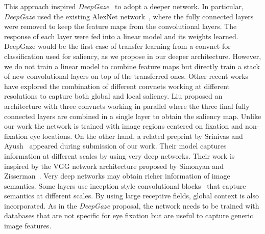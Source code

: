 \documentclass[10pt,twocolumn,letterpaper]{article}
\begin{document}
This approach inspired \textit{DeepGaze}~\cite{kummerer2014deep} to adopt a deeper network. In particular, \textit{DeepGaze} used the existing AlexNet network~\cite{krizhevsky2012imagenet}, where the fully connected layers were removed to keep the feature maps from the convolutional layers. The response of each layer were fed into a linear model and its weights learned. 
DeepGaze would be the first case of transfer learning from a convnet for classification used for saliency, as we propose in our deeper architecture. However, we do not train a linear model to combine feature maps but directly train a stack of new convolutional layers on top of the transferred ones.
Other recent works have explored the combination of different convnets working at different resolutions to capture both global and local saliency.
Liu \etal\cite{liu2015predicting} proposed an architecture with three convnets working in parallel
where the three final fully connected layers are combined in a single layer to obtain the saliency map. Unlike our work the network is trained with image regions centered on fixation and non-fixation eye locations. On the other hand, a related preprint by Srinivas and Ayush~\cite{srinivas2015deepfix} appeared during submission of our work. Their model captures information at different scales by using very deep networks. Their work is inspired by the VGG network architecture proposed by Simonyan and Zisserman~\cite{simonyan2015verydeep}. Very deep networks may obtain richer information of image semantics. Some layers use inception style convolutional blocks~\cite{Szegedy2015goingdeeper} that capture semantics at different scales. By using large receptive fields, global context is also incorporated. As in the  \textit{DeepGaze} proposal, the network needs to be trained with databases that are not specific for eye fixation but are useful to capture generic image features.
\end{document}
